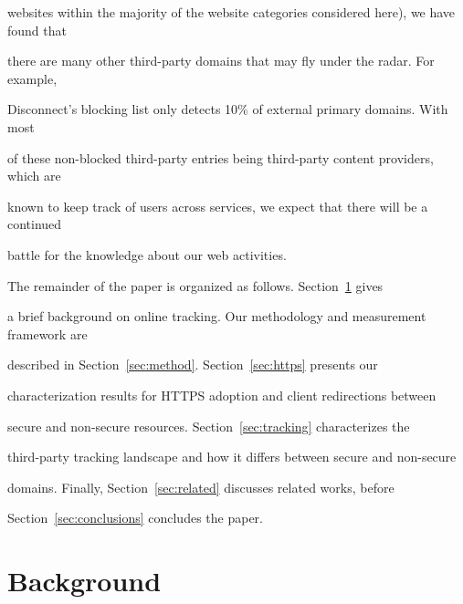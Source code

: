 \documentclass{sig-alternate-10pt}
\begin{document}
websites within the majority of the website categories considered here), we have found that 

there are many other third-party domains that may fly under the radar.  For example, 

Disconnect's blocking list only detects 10\% of external primary domains.  With most 

of these non-blocked third-party entries being third-party content providers, which are 

known to keep track of users across services, we expect that there will be a continued 

battle for the knowledge about our web activities.



The remainder of the paper is organized as follows. Section~\ref{sec:background} gives 

a brief background on online tracking.  Our methodology and measurement framework are 

described in Section~\ref{sec:method}.  Section~\ref{sec:https} presents our 

characterization results for HTTPS adoption and client redirections between 

secure and non-secure resources.  Section~\ref{sec:tracking} characterizes the 

third-party tracking landscape and how it differs between secure and non-secure 

domains. Finally, Section~\ref{sec:related} discusses related works, before 

Section~\ref{sec:conclusions} concludes the paper.





\section{Background}\label{sec:background}








\end{document}
